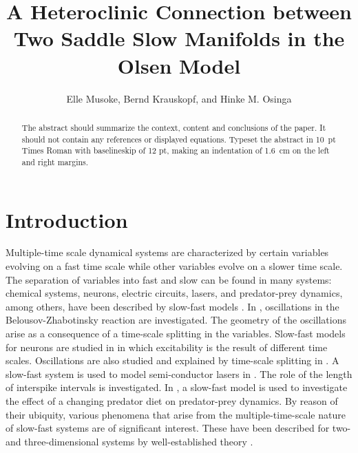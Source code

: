 \documentclass{ws-ijbc}
\begin{document}
\catchline{}{}{}{}{} %


\title{A Heteroclinic Connection between \\ Two Saddle Slow Manifolds in the Olsen Model}

\author{Elle Musoke, Bernd Krauskopf, and Hinke M. Osinga}


\address{Department of Mathematics, University of Auckland, Private Bag 92019\\
Auckland, 1142, New Zealand\\
elle.musoke@auckland.ac.nz}

\maketitle

\begin{history}
\end{history}

\begin{abstract}
The abstract should summarize the context, content and conclusions
of the paper. It should not contain any references or displayed
equations. Typeset the abstract in 10~pt Times Roman with
baselineskip of 12 pt, making an indentation of 1.6~cm on the left
and right margins.
\end{abstract}

\section{Introduction}

Multiple-time scale dynamical systems are characterized by certain variables evolving on a fast time scale while other variables evolve on a slower time scale.  The separation of variables into fast and slow can be found in many systems: chemical systems, neurons, electric circuits, lasers, and predator-prey dynamics, among others, have been described by slow-fast models  \cite{BZ_reaction, Neurons, Circuits, lasers, Predator-Prey}.  In \cite{BZ_reaction}, oscillations in the Belousov-Zhabotinsky reaction are investigated.  The geometry of the oscillations arise as a consequence of a time-scale splitting in the variables.  Slow-fast models for neurons are studied in \cite{Neurons} in which excitability is the result of different time scales.  Oscillations are also studied and explained by time-scale splitting in \cite{Circuits}. A slow-fast system is used to model semi-conductor lasers in \cite{lasers}.  The role of the length of interspike intervals is investigated.  In \cite{Predator-Prey}, a slow-fast model is used to investigate the effect of a changing predator diet on predator-prey dynamics.  By reason of their ubiquity, various phenomena that arise from the multiple-time-scale nature of slow-fast systems are of significant interest. These have been described for two- and three-dimensional systems by well-established theory \cite{canard_explosion, lents-rapides, enlacement,singular_hopf, folded_node,three}.
\end{document}

